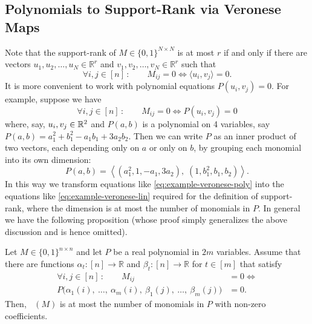 \documentclass[conference]{IEEEtran}
\DeclareMathOperator{\suprank}{rank_0}
\newcommand{\R}{\mathbb{R}}
\begin{document}
\subsection{Polynomials to Support-Rank via Veronese Maps}
\label{section:veronese-maps}

Note that the support-rank of $M\in\{0,1\}^{N\times N}$ is at most $r$ if and only if there are vectors $u_1,u_2,\dots, u_N\in\R^r$ and $v_1,v_2,\dots, v_N\in\R^r$ such that
\begin{equation}
\label{eq:example-veronese-lin}
	\forall i,j\in[n]\,\colon\qquad M_{ij} = 0 \iff \langle u_i, v_j \rangle = 0.
\end{equation}
It is more convenient to work with polynomial equations $P(u_i, v_j) = 0$. For example, suppose we have
\begin{equation}
\label{eq:example-veronese-poly}
	\forall i,j\in[n]\,\colon\qquad M_{ij} = 0 \iff P(u_i, v_j) = 0
\end{equation}
where, say, $u_i, v_j \in \mathbb{R}^2$ and $P(a, b)$ is a polynomial on 4 variables, say $P(a,b) = a_1^2 +
b_1^2 - a_1b_1 + 3a_2b_2$.  Then we can write $P$ as an inner product of two vectors,
each depending only on $a$ or only on $b$, by grouping each monomial into its
own dimension:
\[
  P(a, b) = \left\langle (a_1^2, 1, -a_1, 3a_2), \; (1, b_1^2, b_1, b_2) \right\rangle .
\]
In this way we transform equations like \cref{eq:example-veronese-poly} into the equations like
\cref{eq:example-veronese-lin} required for the definition of support-rank, where the dimension
is at most the number of monomials in $P$. In general we have the following proposition (whose proof simply generalizes the above discussion and is hence omitted).

\begin{proposition}\label{lemma:veronese}
	Let $M\in\{0,1\}^{n\times n}$ and let $P$ be a real polynomial in $2m$ variables. Assume that there are functions $\alpha_t\colon [n]\to \R$ and $\beta_t\colon [n]\to \R$ for $t\in [m]$ that satisfy
\begin{align*}
	\forall i,j\in[n]\,\colon\qquad M_{ij} &= 0 \iff\\
    P\big(\alpha_1(i),\ \dots,\ \alpha_m(i),\ \beta_1(j),\ \dots,\ \beta_m(j)\big) &= 0.
\end{align*}
	Then, $\suprank(M)$ is at most the number of monomials in $P$ with non-zero coefficients.
\end{proposition}
\end{document}

